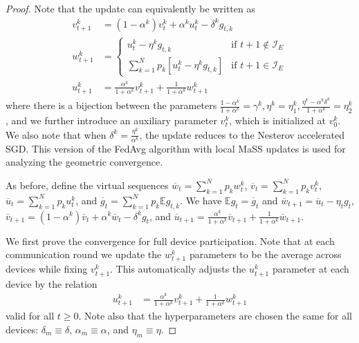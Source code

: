 	\begin{proof}
		
		Note that the update can equivalently be written as 
		\begin{align*}
		v_{t+1}^{k} & =(1-\alpha^{k})v_{t}^{k}+\alpha^{k}u_{t}^{k}-\delta^{k}g_{t,k}\\
		w_{t+1}^{k} & =\begin{cases}
		u_{t}^{k}-\eta^{k}g_{t,k} & \text{if }t+1\notin\mathcal{I}_{E}\\
		\sum_{k=1}^{N}p_{k}\left[u_{t}^{k}-\eta^{k}g_{t,k}\right] & \text{if }t+1\in\mathcal{I}_{E}
		\end{cases}\\
		u_{t+1}^{k} & =\frac{\alpha^{k}}{1+\alpha^{k}}v_{t+1}^{k}+\frac{1}{1+\alpha^{k}}w_{t+1}^{k}
		\end{align*}
		where there is a bijection between the parameters $\frac{1-\alpha^{k}}{1+\alpha^{k}}=\gamma^{k},\eta^{k}=\eta_{1}^{k},\frac{\eta^{k}-\alpha^{k}\delta^{k}}{1+\alpha^{k}}=\eta_{2}^{k}$,
		and we further introduce an auxiliary parameter $v_{t}^{k}$, which
		is initialized at $v_{0}^{k}$. We also note that when $\delta^{k}=\frac{\eta^{k}}{\alpha^{k}}$,
		the update reduces to the Nesterov accelerated SGD. This version of
		the FedAvg algorithm with local MaSS updates is used for analyzing
		the geometric convergence. 
		
		As before, define the virtual sequences $\overline{w}_{t}=\sum_{k=1}^{N}p_{k}w_{t}^{k}$,
		$\overline{v}_{t}=\sum_{k=1}^{N}p_{k}v_{t}^{k}$, $\overline{u}_{t}=\sum_{k=1}^{N}p_{k}u_{t}^{k}$,
		and $\overline{g}_{t}=\sum_{k=1}^{N}p_{k}\mathbb{E}g_{t,k}$. We have
		$\mathbb{E}g_{t}=\overline{g}_{t}$ and $\overline{w}_{t+1}=\overline{u}_{t}-\eta_{t}g_{t}$,
		$\overline{v}_{t+1}=(1-\alpha^{k})\overline{v}_{t}+\alpha^{k}\overline{w}_{t}-\delta^{k}g_{t}$,
		and $\overline{u}_{t+1}=\frac{\alpha^{k}}{1+\alpha^{k}}\overline{v}_{t+1}+\frac{1}{1+\alpha^{k}}\overline{w}_{t+1}$.

		
		We first prove the convergence for full device participation. Note
		that at each communication round we update the $w_{t+1}^{k}$ parameters
		to be the average across devices while fixing $v_{t+1}^{k}$. This
		automatically adjusts the $u_{t+1}^{k}$ parameter at each device
		by the relation 
		\begin{align*}
		u_{t+1}^{k} & =\frac{\alpha^{k}}{1+\alpha^{k}}v_{t+1}^{k}+\frac{1}{1+\alpha^{k}}w_{t+1}^{k}
		\end{align*}
		valid for all $t\geq0$. Note also that the hyperparameters are chosen
		the same for all devices: $\delta_{m}\equiv\delta$, $\alpha_{m}\equiv\alpha$,
		and $\eta_{m}\equiv\eta$. 
		

\end{proof}
